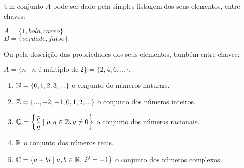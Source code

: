 \documentclass{beamer}
\begin{document}
    \begin{frame}
        \vspace{.4cm}
        Um conjunto $A$ pode ser dado pela simples listagem dos seus elementos, entre chaves:\pause
            \begin{center}
                $A = \{1, bola, carro\}$\pause\\
                $B = \{verdade, falso\}.$\pause
            \end{center}
            

        Ou pela descri{\c c}{\~a}o das propriedades dos seus elementos, tamb\'em  entre chaves:\pause
        \begin{center}
            $A = \{n \mid n \mbox{ \'e m{\'u}ltiplo de } 2\} = \{2,4,6,...\}.$\pause
        \end{center}

        \begin{enumerate}[label={\arabic*})]
            \item $\mathbb{N} = \{0,1,2,3,...\}$ o conjunto do n{\'u}meros naturais.\pause
            \item $\mathbb{Z} = \{...,-2,-1,0,1,2,...\}$ o conjunto dos n{\'u}meros inteiros.\pause
            \item $\mathbb{Q} = \left\{\dfrac{p}{q} \mid p,q \in \mathbb{Z}, q \neq 0 \right\}$ o conjunto dos n{\'u}meros racionais.\pause
            \item $\mathbb{R} $ o conjunto dos n{\'u}meros reais.\pause
            \item $\mathbb{C} = \{a + bi \mid a,b \in \mathbb{R},\ i^2 = -1\}$ o conjunto dos n\'umeros complexos.
        \end{enumerate}
    \end{frame}
\end{document}
